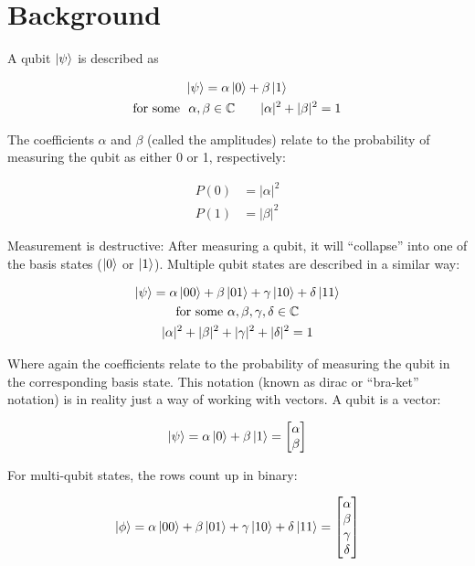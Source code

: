 \section{Background} \label{background}
A qubit $\ket \psi$ is described as

\begin{gather*}
    \ket{\psi} = \alpha \ket{0} + \beta \ket{1} \\
    \text{for some }\ \alpha, \beta \in \mathbb C \quad \quad
    |\alpha|^2 + |\beta|^2 = 1
\end{gather*}

\noindent The coefficients $\alpha$ and $\beta$ (called the amplitudes)
relate to the probability of measuring the qubit as either 0 or 1, respectively:

\begin{align*}
  P(0) &= |\alpha|^2\\
  P(1) &= |\beta|^2
\end{align*}

\noindent Measurement is destructive: After measuring a qubit, 
it will ``collapse'' into one of the basis states
($\ket{0}$ or $\ket{1}$).
% 
Multiple qubit states are described in a similar way:

\begin{gather*}
    \ket{\psi} = \alpha \ket{00} + \beta \ket {01} + \gamma \ket{10} + \delta \ket {11} \\
    \text{for some } \alpha, \beta, \gamma, \delta \in \mathbb C \\
    |\alpha|^2 + |\beta|^2 + |\gamma|^2 + |\delta|^2 = 1
\end{gather*}

\noindent Where again the coefficients relate to the probability of 
measuring the qubit in the corresponding basis state.
% 
This notation (known as dirac or ``bra-ket'' notation) is 
in reality just a way of working with vectors. 
A qubit is a vector:

$$
\ket {\psi} = \alpha \ket{0} + \beta \ket{1} = \begin{bmatrix}
  \alpha \\ \beta
\end{bmatrix}
$$

\noindent For multi-qubit states, the rows count up in binary:

$$
\ket \phi = \alpha \ket {00} + \beta \ket {01} +  \gamma \ket{10} + \delta \ket{11} = 
\begin{bmatrix}
  \alpha \\ \beta \\ \gamma \\ \delta
\end{bmatrix}
$$

